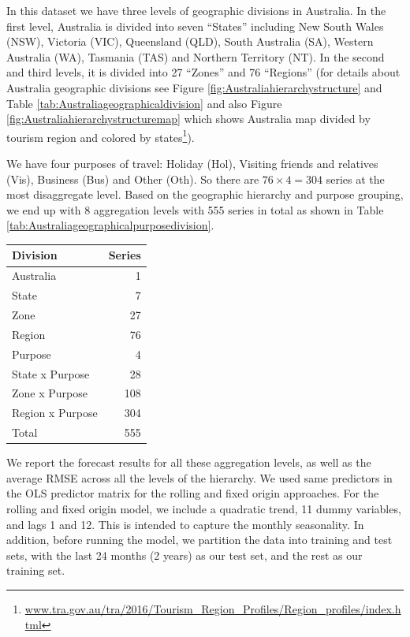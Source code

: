 \documentclass[11pt,a4paper,]{article}
\let\origtable\table
\let\endorigtable\endtable
\renewenvironment{table}[1][2] {
    \expandafter\origtable\expandafter[!htbp]
} {
    \endorigtable
}
\begin{document}
In this dataset we have three levels of geographic divisions in Australia. In the first level, Australia is divided into seven ``States'' including New South Wales (NSW), Victoria (VIC), Queensland (QLD), South Australia (SA), Western Australia (WA), Tasmania (TAS) and Northern Territory (NT). In the second and third levels, it is divided into 27 ``Zones'' and 76 ``Regions'' (for details about Australia geographic divisions see Figure \ref{fig:Australiahierarchystructure} and Table \ref{tab:Australiageographicaldivision} and also Figure \ref{fig:Australiahierarchystructuremap} which shows Australia map divided by tourism region and colored by states\footnote{\url{www.tra.gov.au/tra/2016/Tourism_Region_Profiles/Region_profiles/index.html}}).

We have four purposes of travel: Holiday (Hol), Visiting friends and relatives (Vis), Business (Bus) and Other (Oth). So there are \(76\times4 = 304\) series at the most disaggregate level. Based on the geographic hierarchy and purpose grouping, we end up with 8 aggregation levels with 555 series in total as shown in Table \ref{tab:Australiageographicalpurposedivision}.

\begin{table}[!h]

\caption{\label{tab:Australiageographicalpurposedivision}Number of Australian domestic tourism series at each aggregation level.}
\centering
\begin{tabular}[t]{lr}
\toprule
Division & Series\\
\midrule
Australia & 1\\
State & 7\\
Zone & 27\\
Region & 76\\
Purpose & 4\\
State x Purpose & 28\\
Zone x Purpose & 108\\
Region x Purpose & 304\\
\hline
Total & 555\\
\bottomrule
\end{tabular}
\end{table}

We report the forecast results for all these aggregation levels, as well as the average RMSE across all the levels of the hierarchy. We used same predictors in the OLS predictor
matrix for the rolling and fixed origin approaches. For the rolling and fixed origin model, we include a quadratic trend, 11 dummy variables, and lags 1 and 12. This is intended to capture the monthly seasonality. In addition, before running the model, we partition the data into training and test sets, with the last 24 months (2 years) as our test set, and the rest as our training set.
\end{document}
